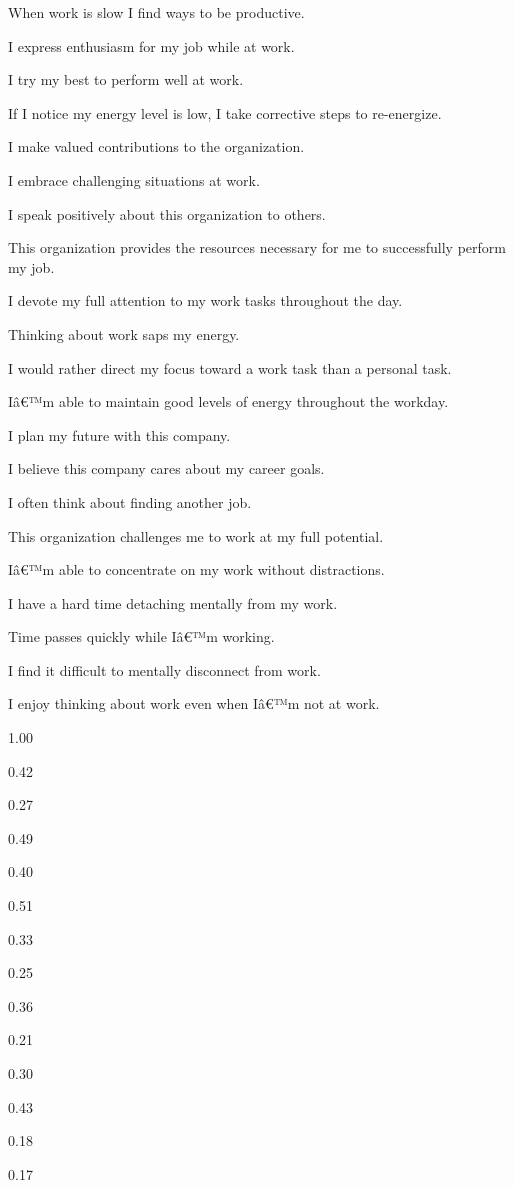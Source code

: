 \documentclass[
]{book}
\begin{document}
When work is slow I find ways to be productive.

I express enthusiasm for my job while at work.

I try my best to perform well at work.

If I notice my energy level is low, I take corrective steps to re-energize.

I make valued contributions to the organization.

I embrace challenging situations at work.

I speak positively about this organization to others.

This organization provides the resources necessary for me to successfully perform my job.

I devote my full attention to my work tasks throughout the day.

Thinking about work saps my energy.

I would rather direct my focus toward a work task than a personal task.

Iâ€™m able to maintain good levels of energy throughout the workday.

I plan my future with this company.

I believe this company cares about my career goals.

I often think about finding another job.

This organization challenges me to work at my full potential.

Iâ€™m able to concentrate on my work without distractions.

I have a hard time detaching mentally from my work.

Time passes quickly while Iâ€™m working.

I find it difficult to mentally disconnect from work.

I enjoy thinking about work even when Iâ€™m not at work.

1.00

0.42

0.27

0.49

0.40

0.51

0.33

0.25

0.36

0.21

0.30

0.43

0.18

0.17
\end{document}
